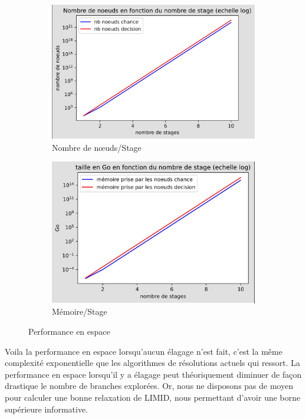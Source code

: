 \documentclass[12pt]{article}
\begin{document}
\begin{figure}[h]
\centering
\begin{subfigure}{.5\textwidth}
  \centering
  \includegraphics[width=.65\linewidth]{docs/ressources_rapport/perf_espace.png}
  \caption{Nombre de nœuds/Stage}
  \label{fig:sub8}
\end{subfigure}%
\begin{subfigure}{.5\textwidth}
  \centering
  \includegraphics[width=.65\linewidth]{docs/ressources_rapport/perf_Go.png}
  \caption{Mémoire/Stage}
  \label{fig:sub9}
\end{subfigure}
\caption{Performance en espace}
\label{fig:test4}
\end{figure}

Voila la performance en espace lorsqu'aucun élagage n'est fait, c'est la même complexité exponentielle que les algorithmes de résolutions actuels qui ressort. La performance en espace lorsqu'il y a élagage peut théoriquement diminuer de façon drastique le nombre de branches explorées. Or, nous ne disposons pas de moyen pour calculer une bonne relaxation de LIMID, nous permettant d'avoir une borne supérieure informative.
\end{document}
